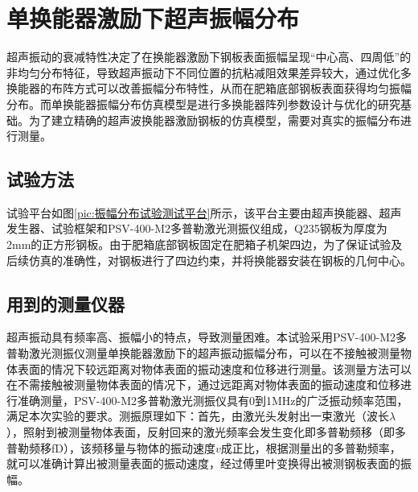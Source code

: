 \section{单换能器激励下超声振幅分布}

超声振动的衰减特性决定了在换能器激励下钢板表面振幅呈现“中心高、四周低”的非均匀分布特征，导致超声振动下不同位置的抗粘减阻效果差异较大，通过优化多换能器的布阵方式可以改善振幅分布特性，从而在肥箱底部钢板表面获得均匀振幅分布。而单换能器振幅分布仿真模型是进行多换能器阵列参数设计与优化的研究基础。为了建立精确的超声波换能器激励钢板的仿真模型，需要对真实的振幅分布进行测量。

\subsection{试验方法}

试验平台如图\ref{pic:振幅分布试验测试平台}所示，该平台主要由超声换能器、超声发生器、试验框架和PSV-400-M2多普勒激光测振仪组成，Q235钢板为厚度为2mm的正方形钢板。由于肥箱底部钢板固定在肥箱子机架四边，为了保证试验及后续仿真的准确性，对钢板进行了四边约束，并将换能器安装在钢板的几何中心。



\subsection{用到的测量仪器}

超声振动具有频率高、振幅小的特点，导致测量困难。本试验采用PSV-400-M2多普勒激光测振仪测量单换能器激励下的超声振动振幅分布，可以在不接触被测量物体表面的情况下较远距离对物体表面的振动速度和位移进行测量。该测量方法可以在不需接触被测量物体表面的情况下，通过远距离对物体表面的振动速度和位移进行准确测量，PSV-400-M2多普勒激光测振仪具有0到1MHz的广泛振动频率范围，满足本次实验的要求。测振原理如下：首先，由激光头发射出一束激光（波长$\lambda$），照射到被测量物体表面，反射回来的激光频率会发生变化即多普勒频移（即多普勒频移fD），该频移量与物体的振动速度$v$成正比，根据测量出的多普勒频率，就可以准确计算出被测量表面的振动速度，经过傅里叶变换得出被测钢板表面的振幅。

